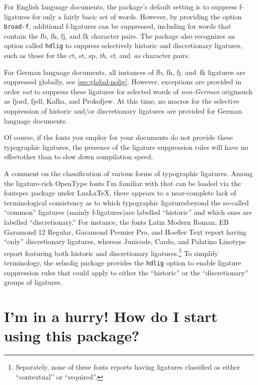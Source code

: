 \documentclass[12pt]{article}
\newcommand{\pkg}[1]{\textsf{#1}}
\newcommand{\opt}[1]{\texttt{#1}}
\begin{document}
For English language documents, the package's default setting is to suppress f-ligatures for only a fairly basic set of words. However, by providing the option \opt{broad-f}, additional f-ligatures can be suppressed, including for words that contain the {\ebg \mbox{fb}, \mbox{fh}, \mbox{fj}, and \mbox{fk}} character pairs. The package also recognizes an option called \opt{hdlig} to suppress selectively historic and discretionary ligatures, such as those for the ct, st, sp, \emph{th}, \emph{et}, and~\emph{as} character pairs. 


For German language documents, all instances of {\ebg \mbox{fb}, \mbox{fh}, \mbox{fj}, and~\mbox{fk}} ligatures are suppressed globally, see \cref{sec:global-nolig}. However, exceptions are provided in order \emph{not} to suppress these ligatures for selected words of \emph{non-German} origin\textemdash such as fjord, fjell, {\ebg Kafka}, and Prokofjew. At this time, no macros for the selective suppression of historic and/or discretionary ligatures are provided for German language documents.

Of course, if the fonts you employ for your documents do not provide these typographic ligatures, the presence of the ligature suppression rules will have no effect\textemdash other than to slow down compilation speed.

 

A comment on the classification of various forms of typographic ligatures. Among the ligature-rich OpenType fonts I'm familiar with that can be loaded via the \pkg{fontspec} package under Lua\LaTeX, there appears to a near-complete lack of terminological consistency as to which typographic ligatures\textemdash beyond the so-called \enquote{common} ligatures (mainly f-ligatures)\textemdash are labelled \enquote{historic} and which ones are labelled \enquote{discretionary.} For instance, the fonts Latin Modern Roman, EB Garamond 12 Regular, Garamond Premier Pro, and Hoefler Text report having \enquote{only} discretionary ligatures, whereas Junicode, Cardo, and Palatino Linotype report  featuring both historic and discretionary ligatures.\footnote{Separately, none of these fonts reports having ligatures classified as either \enquote{contextual} or \enquote{required}.} To simplify terminology, the \pkg{selnolig} package provides the \opt{hdlig} option to enable ligature suppression rules that could apply to either the \enquote{historic} or the \enquote{discretionary} groups of ligatures.

\section{I'm in a hurry! How do I start using this package?}
\end{document}
